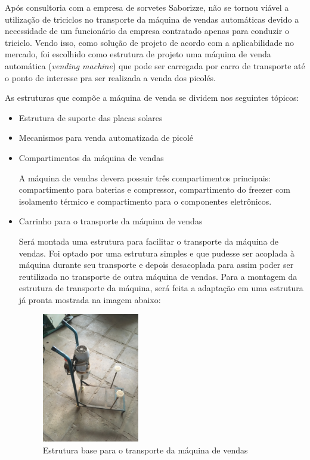 Após consultoria com a empresa de sorvetes Saborizze, não se tornou viável a utilização de triciclos no transporte da máquina de vendas automáticas devido a necessidade de um funcionário da empresa contratado apenas para conduzir o triciclo. Vendo isso, como solução de projeto de acordo com a aplicabilidade no mercado, foi escolhido como estrutura de projeto uma máquina de venda automática (\textit{vending machine}) que pode ser carregada por carro de transporte até o ponto de interesse pra ser realizada a venda dos picolés.

 As estruturas que compõe a máquina de venda se dividem nos seguintes tópicos:
 
 \begin{itemize}
\item Estrutura de suporte das placas solares



\item Mecanismos para venda automatizada de picolé



\item Compartimentos da máquina de vendas

A máquina de vendas devera possuir três compartimentos principais: compartimento para baterias e compressor, compartimento do freezer com isolamento térmico e compartimento para o componentes eletrônicos. 

\item Carrinho para o transporte da máquina de vendas

	Será montada uma estrutura para facilitar o transporte da máquina de vendas. Foi optado por uma estrutura simples e que pudesse ser acoplada à máquina durante seu transporte e depois desacoplada para assim poder ser reutilizada no transporte de outra máquina de vendas. 
	Para a montagem da estrutura de transporte da máquina, será feita a adaptação em uma estrutura já pronta mostrada na imagem abaixo:
    
   \begin{figure}[H]
	\centering
    \includegraphics[width=0.4\textwidth]{figuras/mecanismodetransporte}
    \caption{Estrutura base para o transporte da máquina de vendas}
    \label{fig:mecanismodetransporte}
\end{figure}

\end{itemize} 

